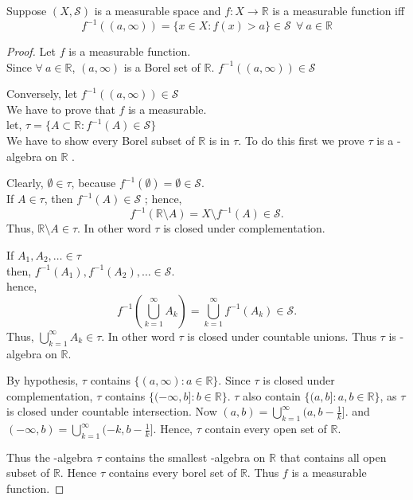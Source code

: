 \begin{theorem}
    Suppose $(X,\mathcal{S})$ is a measurable space and $f:X\to\mathds{R}$ is a measurable function iff 
    \[
        f^{-1}((a,\infty))=\{x\in X: f(x)>a\}\in\mathcal{S}\ \ \forall \ a\in\mathds{R}
    \]
\end{theorem}
\begin{proof}
    Let $f$ is a measurable function.\\
    Since $\forall \ a \in\mathds{R}$, $(a,\infty)$ is a Borel set of  $\mathds{R}$. $f^{-1}((a,\infty))\in \mathcal{S}$
    
    Conversely, let $f^{-1}((a,\infty))\in \mathcal{S}$\\
    We have to prove that $f$ is a measurable.\\
    let,  $\tau=\{A\subset\mathds{R}:f^{-1}(A)\in\mathcal{S}\}$\\
    We have to show every Borel subset of $\mathds{R}$ is in $\tau$. To do this first we prove $\tau$ is a  \sig-algebra on $\mathds{R}$ .

    Clearly, $\emptyset\in\tau$, because  $f^{-1}(\emptyset)=\emptyset\in \mathcal{S}$.\\
    If $A\in\tau$, then  $f^{-1}(A)\in\mathcal{S}$ ; hence,
    \[
        f^{-1}(\mathds{R}\setminus A)=X\setminus f^{-1}(A)\in \mathcal{S}.
    \]
    Thus, $\mathds{R}\setminus A\in \tau$. In other word $\tau$ is closed  under complementation.

    If $A_1,A_2,\ldots\in \tau$\\
    then, $f^{-1}(A_1),f^{-1}(A_2),\ldots\in\mathcal{S}$.\\
    hence, 
    \[
        f^{-1}(\bigcup_{k=1}^{\infty}A_k)=\bigcup_{k=1}^{\infty}f^{-1}(A_k)\in \mathcal{S}.
    \]
    Thus, $\bigcup_{k=1}^{\infty}A_k\in\tau$. In other word $\tau$ is closed under countable unions. Thus  $\tau$ is \sig-algebra on  $\mathds{R}$.
    
    By hypothesis, $\tau$ contains  $\{(a,\infty):a\in\mathds{R}\}$. Since $\tau$ is closed under complementation,  $\tau$ contains  $\{(-\infty,b]:b\in\mathds{R}\}$.
    $\tau$ also contain  $\{(a,b]:a,b\in\mathds{R}\}$, as $\tau$ is closed under countable intersection. Now  $(a,b)=\bigcup_{k=1}^{\infty}(a,b-\frac{1}{k}]$.
    and $(-\infty,b)=\bigcup_{k=1}^{\infty}(-k,b-\frac{1}{k}]$. Hence, $\tau$ contain every open set of  $\mathds{R}$.

    Thus the \sig-algebra $\tau$ contains the smallest  \sig-algebra on  $\mathds{R}$ that contains all open subset of $\mathds{R}$. Hence $\tau$ contains every borel set of  $\mathds{R}$. Thus $f$ is a measurable function.
\end{proof}

